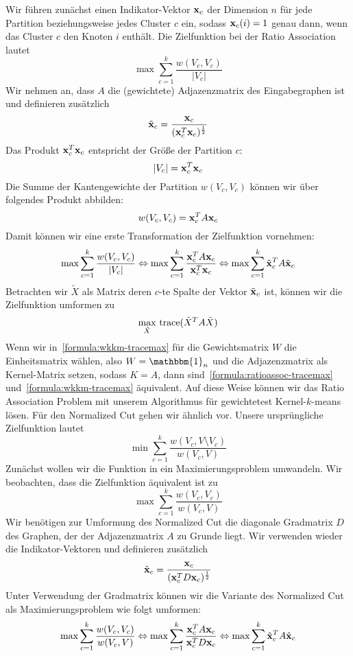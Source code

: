 Wir führen zunächst einen Indikator-Vektor $\mathbf{x}_c$ der Dimension $n$ für jede Partition beziehungsweise jedes Cluster $c$
ein, sodass $\mathbf{x}_c(i) = 1$ genau dann, wenn das Cluster $c$ den Knoten $i$ enthält. Die Zielfunktion bei der Ratio
Association lautet
\[ \max \sum_{c=1}^{k} \frac{w(V_c, V_c)}{\left|V_c\right|} \]
Wir nehmen an, dass $A$ die (gewichtete) Adjazenzmatrix des Eingabegraphen ist und definieren zusätzlich
\[ \tilde{\mathbf{x}}_c = \frac{\mathbf{x}_c}{(\mathbf{x}_c^T \mathbf{x}_c)^\frac{1}{2}} \]
Das Produkt $\mathbf{x}_c^T \mathbf{x}_c$ entspricht der Größe der Partition $c$:
\[ \left|V_c\right| = \mathbf{x}_c^T \mathbf{x}_c \]
Die Summe der Kantengewichte der Partition $w(V_c, V_c)$ können wir über folgendes Produkt abbilden:
\[ w(V_c, V_c) = \mathbf{x}_c^T A \mathbf{x}_c \]
Damit können wir eine erste Transformation der Zielfunktion vornehmen:
\[ \max \sum_{c=1}^{k} \frac{w(V_c, V_c)}{\left|V_c\right|}
	\Leftrightarrow \max \sum_{c=1}^{k} \frac{\mathbf{x}_c^T A \mathbf{x}_c}{\mathbf{x}_c^T \mathbf{x}_c}
	\Leftrightarrow \max \sum_{c=1}^{k} \tilde{\mathbf{x}}_c^T A \tilde{\mathbf{x}}_c \]
Betrachten wir $\tilde{X}$ als Matrix deren $c$-te Spalte der Vektor $\tilde{\mathbf{x}}_c$ ist, können wir die Zielfunktion
umformen zu
\begin{align}
\label{formula:ratioassoc-tracemax}
	\max_{\tilde{X}}{} \operatorname*{trace}( \tilde{X}^T A \tilde{X} )
\end{align}
Wenn wir in~\ref{formula:wkkm-tracemax} für die Gewichtsmatrix $W$ die Einheitsmatrix wählen, also $W = \mathbbm{1}_n$ und
die Adjazenzmatrix als Kernel-Matrix setzen, sodass $K = A$, dann sind~\ref{formula:ratioassoc-tracemax}
und~\ref{formula:wkkm-tracemax} äquivalent. Auf diese Weise können wir das Ratio Association Problem mit unserem Algorithmus
für gewichtetest Kernel-$k$-means lösen.
\absatz
Für den Normalized Cut gehen wir ähnlich vor. Unsere ursprüngliche Zielfunktion lautet
\[ \min \sum_{c=1}^{k} \frac{w(V_c, V \setminus V_c)}{w(V_c, V)} \]
Zunächst wollen wir die Funktion in ein Maximierungsproblem umwandeln. Wir beobachten, dass die Zielfunktion äquivalent ist
zu
\[ \max \sum_{c=1}^{k} \frac{w(V_c, V_c)}{w(V_c, V)} \]
Wir benötigen zur Umformung des Normalized Cut die diagonale Gradmatrix $D$ des Graphen, der der Adjazenzmatrix $A$ zu
Grunde liegt. Wir verwenden wieder die Indikator-Vektoren und definieren zusätzlich
\[ \hat{\mathbf{x}}_c = \frac{\mathbf{x}_c}{ (\mathbf{x}_c^T D \mathbf{x}_c)^{\frac{1}{2}} } \]
Unter Verwendung der Gradmatrix können wir die Variante des Normalized Cut als Maximierungsproblem wie folgt umformen:
\[ \max \sum_{c=1}^{k} \frac{w(V_c, V_c)}{w(V_c, V)}
	\Leftrightarrow \max \sum_{c=1}^{k} \frac{\mathbf{x}_c^T A \mathbf{x}_c}{\mathbf{x}_c^T D \mathbf{x}_c} 
	\Leftrightarrow \max \sum_{c=1}^{k} \hat{\mathbf{x}}_c^T A \hat{\mathbf{x}}_c \]
